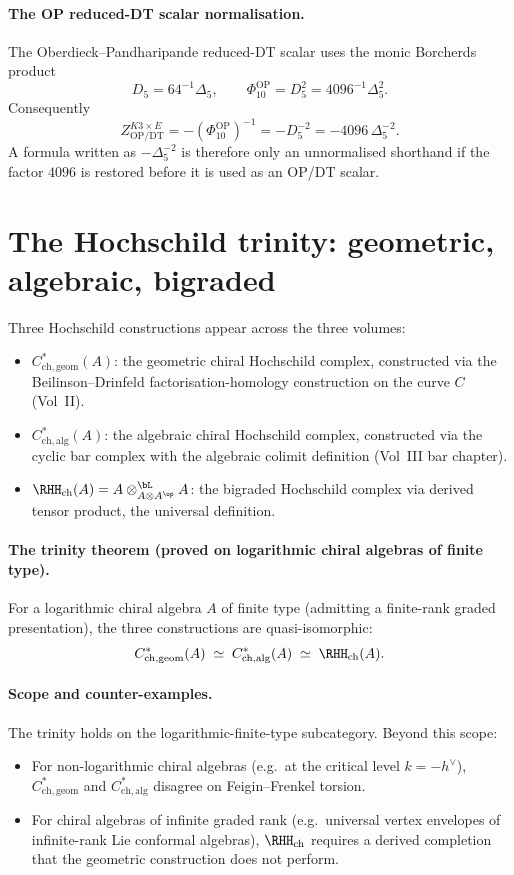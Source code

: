 \paragraph{The OP reduced-DT scalar normalisation.}
The Oberdieck--Pandharipande reduced-DT scalar uses the monic Borcherds
product
\[
 D_5 = 64^{-1}\Delta_5,
 \qquad
 \Phi_{10}^{\mathrm{OP}} = D_5^2 = 4096^{-1}\Delta_5^2.
\]
Consequently
\[
 Z_{\mathrm{OP/DT}}^{K3\times E}
 = -(\Phi_{10}^{\mathrm{OP}})^{-1}
 = -D_5^{-2}
 = -4096\,\Delta_5^{-2}.
\]
A formula written as $-\Delta_5^{-2}$ is therefore only an
unnormalised shorthand if the factor $4096$ is restored before it is
used as an OP/DT scalar.


\section{The Hochschild trinity: geometric, algebraic, bigraded}
\label{sec:hochschild-trinity}

Three Hochschild constructions appear across the three volumes:
\begin{itemize}
 \item $C^{*}_{\mathrm{ch,geom}}(A)$: the geometric chiral Hochschild complex,
 constructed via the Beilinson--Drinfeld factorisation-homology
 construction on the curve $C$ (Vol~II).
 \item $C^{*}_{\mathrm{ch,alg}}(A)$: the algebraic chiral Hochschild complex,
 constructed via the cyclic bar complex with the algebraic colimit
 definition (Vol~III bar chapter).
 \item $\RHH_{\mathrm{ch}}(A) = A \otimes^{\bL}_{A \otimes A^{\op}} A$:
 the bigraded Hochschild complex via derived tensor product, the
 universal definition.
\end{itemize}

\paragraph{The trinity theorem (proved on logarithmic chiral algebras of
finite type).}
For a logarithmic chiral algebra $A$ of finite type \textup{(}admitting
a finite-rank graded presentation\textup{),} the three constructions are
quasi-isomorphic:
\[
 C^{*}_{\mathrm{ch,geom}}(A) \;\simeq\; C^{*}_{\mathrm{ch,alg}}(A) \;\simeq\; \RHH_{\mathrm{ch}}(A).
\]

\paragraph{Scope and counter-examples.}
The trinity holds on the logarithmic-finite-type subcategory. Beyond this
scope:
\begin{itemize}
 \item For non-logarithmic chiral algebras (e.g.\ at the critical level
 $k = -h^{\vee}$), $C^{*}_{\mathrm{ch,geom}}$ and
 $C^{*}_{\mathrm{ch,alg}}$ disagree on Feigin--Frenkel torsion.
 \item For chiral algebras of infinite graded rank (e.g.\ universal vertex
 envelopes of infinite-rank Lie conformal algebras), $\RHH_{\mathrm{ch}}$
 requires a derived completion that the geometric construction does
 not perform.
\end{itemize}

